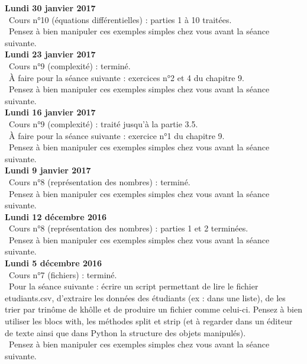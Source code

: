 \documentclass[12pt,a4paper]{article}
\begin{document}
\noindent\textbf{Lundi 30 janvier 2017}\\
\bu\ Cours n°10 (équations différentielles) : parties 1 à 10 traitées. \\
\bu\ Pensez à bien manipuler ces exemples simples chez vous avant la séance suivante. \vspace{.4cm}\\

\noindent\textbf{Lundi 23 janvier 2017}\\
\bu\ Cours n°9 (complexité) : terminé. \\
\bu\ À faire pour la séance suivante : exercices n°2 et 4 du chapitre 9.\\
\bu\ Pensez à bien manipuler ces exemples simples chez vous avant la séance suivante. \vspace{.4cm}\\

\noindent\textbf{Lundi 16 janvier 2017}\\
\bu\ Cours n°9 (complexité) : traité jusqu'à la partie 3.5. \\
\bu\ À faire pour la séance suivante : exercice n°1 du chapitre 9.\\
\bu\ Pensez à bien manipuler ces exemples simples chez vous avant la séance suivante. \vspace{.4cm}\\

\noindent\textbf{Lundi 9 janvier 2017}\\
\bu\ Cours n°8 (représentation des nombres) : terminé. \\
\bu\ Pensez à bien manipuler ces exemples simples chez vous avant la séance suivante. \vspace{.4cm}\\

\noindent\textbf{Lundi 12 décembre 2016 }\\
\bu\ Cours n°8 (représentation des nombres) : parties 1 et 2 terminées. \\
\bu\ Pensez à bien manipuler ces exemples simples chez vous avant la séance suivante. \vspace{.4cm}\\

\noindent\textbf{Lundi 5 décembre 2016 }\\
\bu\ Cours n°7 (fichiers) : terminé. \\
\bu\ Pour la séance suivante : écrire un script permettant de lire le fichier etudiants.csv, d'extraire les données des étudiants (ex : dans une liste), de les trier par trinôme de khôlle et de produire un fichier comme celui-ci. 
Pensez à bien utiliser les blocs with, les méthodes split et strip (et à regarder dans un éditeur de texte ainsi que dans Python la structure des objets manipulés). \\
\bu\ Pensez à bien manipuler ces exemples simples chez vous avant la séance suivante. \vspace{.4cm}\\
\end{document}
